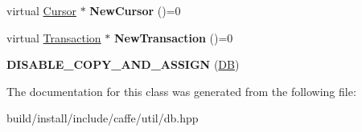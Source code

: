 \begin{DoxyCompactItemize}
virtual \mbox{\hyperlink{classcaffe_1_1db_1_1_cursor}{Cursor}} $\ast$ {\bfseries New\+Cursor} ()=0
\item 
\mbox{\label{classcaffe_1_1db_1_1_d_b_a346f1668d90dc24492ffc0d2d9f7097c}} 
virtual \mbox{\hyperlink{classcaffe_1_1db_1_1_transaction}{Transaction}} $\ast$ {\bfseries New\+Transaction} ()=0
\item 
\mbox{\label{classcaffe_1_1db_1_1_d_b_aaffc660573d0b233cb2dfecf2e3aabae}} 
{\bfseries D\+I\+S\+A\+B\+L\+E\+\_\+\+C\+O\+P\+Y\+\_\+\+A\+N\+D\+\_\+\+A\+S\+S\+I\+GN} (\mbox{\hyperlink{classcaffe_1_1db_1_1_d_b}{DB}})
\end{DoxyCompactItemize}


The documentation for this class was generated from the following file\+:\begin{DoxyCompactItemize}
\item 
build/install/include/caffe/util/db.\+hpp\end{DoxyCompactItemize}
